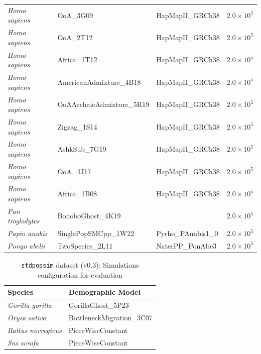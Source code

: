 \documentclass[9pt,twoside]{pnas-new} %
\newcommand{\stdpopsim}{\texttt{stdpopsim}\xspace}
\begin{document}
\begin{table}[t]
{\begin{tabular}{llll}
        \emph{Homo sapiens}    & OoA\_3G09 & HapMapII\_GRCh38 & $2.0\times10^{5}$ \\
        \emph{Homo sapiens}    & OoA\_2T12 & HapMapII\_GRCh38 & $2.0\times10^{5}$ \\
        \emph{Homo sapiens}    & Africa\_1T12 & HapMapII\_GRCh38 & $2.0\times10^{5}$ \\
        \emph{Homo sapiens}    & AmericanAdmixture\_4B18 & HapMapII\_GRCh38 & $2.0\times10^{5}$ \\
        \emph{Homo sapiens}    & OoAArchaicAdmixture\_5R19 & HapMapII\_GRCh38 & $2.0\times10^{5}$ \\
        \emph{Homo sapiens}    & Zigzag\_1S14 & HapMapII\_GRCh38 & $2.0\times10^{5}$ \\
        \emph{Homo sapiens}    & AshkSub\_7G19 & HapMapII\_GRCh38 & $2.0\times10^{5}$ \\
        \emph{Homo sapiens}    & OoA\_4J17 & HapMapII\_GRCh38 & $2.0\times10^{5}$ \\
        \emph{Homo sapiens}    & Africa\_1B08 & HapMapII\_GRCh38 & $2.0\times10^{5}$ \\
        \emph{Pan troglodytes}    & BonoboGhost\_4K19 & & $2.0\times10^{5}$ \\
        \emph{Papio anubis}    & SinglePopSMCpp\_1W22 & Pyrho\_PAnubis1\_0 & $2.0\times10^{5}$ \\
        \emph{Pongo abelii}    & TwoSpecies\_2L11 & NaterPP\_PonAbe3 & $2.0\times10^{5}$ \\
        \bottomrule
    \end{tabular}
    }
\end{table}



\begin{table}[h!]
    \centering
    \caption{\stdpopsim dataset (v0.3): Simulations configuration for evaluation}
    \label{tab:stdpopsim-dataset-v0.3}
    \begin{tabular}{ll}
        \toprule
        \textbf{Species} & \textbf{Demographic Model}\\
        \midrule
        \emph{Gorilla gorilla}    & GorillaGhost\_5P23 \\
        \emph{Oryza sativa}    & BottleneckMigration\_3C07  \\
        \emph{Rattus norvegicus}    & PieceWiseConstant  \\
        \emph{Sus scrofa}    & PieceWiseConstant \\
        \bottomrule
    \end{tabular}
\end{table}
\end{document}
